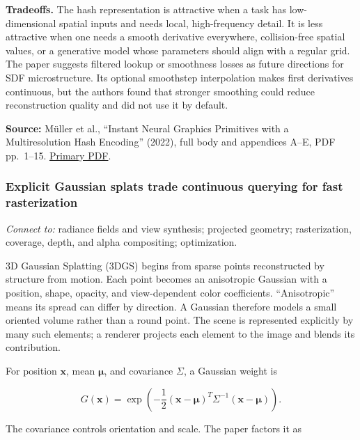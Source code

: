 \textbf{Tradeoffs.} The hash representation is attractive when a task has low-dimensional spatial inputs and needs local, high-frequency detail. It is less attractive when one needs a smooth derivative everywhere, collision-free spatial values, or a generative model whose parameters should align with a regular grid. The paper suggests filtered lookup or smoothness losses as future directions for SDF microstructure. Its optional smoothstep interpolation makes first derivatives continuous, but the authors found that stronger smoothing could reduce reconstruction quality and did not use it by default.

\textbf{Source:} Müller et al., ``Instant Neural Graphics Primitives with a Multiresolution Hash Encoding'' (2022), full body and appendices A--E, PDF pp.~1--15. \href{https://nvlabs.github.io/instant-ngp/assets/mueller2022instant.pdf}{Primary PDF}.

\subsubsection{Explicit Gaussian splats trade continuous querying for fast rasterization}\label{04-visual-computing-ii-ch034-explicit-gaussian-splats-trade-continuous-querying-for-fast-rasterization}

\hypertarget{04-visual-computing-ii-ch034-explicit-gaussian-splats-trade-continuous-querying-for-fast-rasterization}{}

\emph{Connect to:} radiance fields and view synthesis; projected geometry; rasterization, coverage, depth, and alpha compositing; optimization.

3D Gaussian Splatting (3DGS) begins from sparse points reconstructed by structure from motion. Each point becomes an anisotropic Gaussian with a position, shape, opacity, and view-dependent color coefficients. ``Anisotropic'' means its spread can differ by direction. A Gaussian therefore models a small oriented volume rather than a round point. The scene is represented explicitly by many such elements; a renderer projects each element to the image and blends its contribution.

For position \(\mathbf{x}\), mean \(\boldsymbol\mu\), and covariance \(\Sigma\), a Gaussian weight is

\[G(\mathbf{x})=\exp\left(-\frac{1}{2}(\mathbf{x}-\boldsymbol\mu)^T\Sigma^{-1}(\mathbf{x}-\boldsymbol\mu)\right).\]

The covariance controls orientation and scale. The paper factors it as

